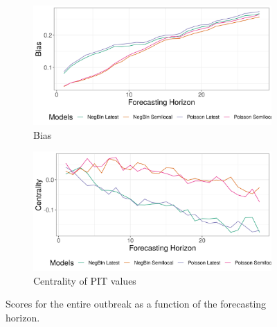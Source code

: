 \begin{figure}[H]
\begin{subfigure}{0.5\textwidth}
  \centering
  \includegraphics[width=\linewidth]{../output/Lubero_bias.png}  
  \caption{Bias}
  \label{fig:sub-third}
\end{subfigure}
\begin{subfigure}{0.5\textwidth}
  \centering
  \includegraphics[width=\linewidth]{../output/Lubero_centrality.png}  
  \caption{Centrality of PIT values}
  \label{fig:nat_scores_4}
\end{subfigure}
  \caption{Scores for the entire outbreak as a function of the forecasting horizon.}

  \label{fig:nat_scores}
\end{figure}
